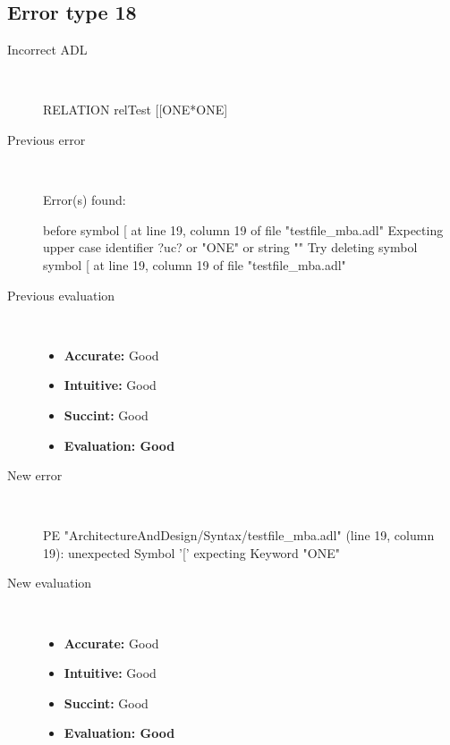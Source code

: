 \hrulefill

\subsection{Error type 18}
  \begin{description}
  \item[Incorrect ADL]~\\
\begin{adl}
RELATION relTest [[ONE*ONE]\end{adl}
  \item[Previous error]~\\
\begin{haskell}
Error(s) found:

before symbol [ at line 19, column 19 of file "testfile_mba.adl"
Expecting upper case identifier ?uc? or "ONE" or string ""
Try deleting symbol symbol [ at line 19, column 19 of file "testfile_mba.adl"
\end{haskell}
  \item[Previous evaluation]~\\
    \begin{itemize}
    \item \textbf{Accurate:} Good
    \item \textbf{Intuitive:} Good
    \item \textbf{Succint:} Good
    \item \textbf{Evaluation: Good}
    \end{itemize}
  \item[New error]~\\
\begin{haskell}
PE "ArchitectureAndDesign/Syntax/testfile_mba.adl" (line 19, column 19):
unexpected Symbol '['
expecting Keyword "ONE"\end{haskell}
  \item[New evaluation]~\\
    \begin{itemize}
    \item \textbf{Accurate:} Good
    \item \textbf{Intuitive:} Good
    \item \textbf{Succint:} Good
    \item \textbf{Evaluation: Good
}
    \end{itemize}
  \end{description}

\hrulefill

